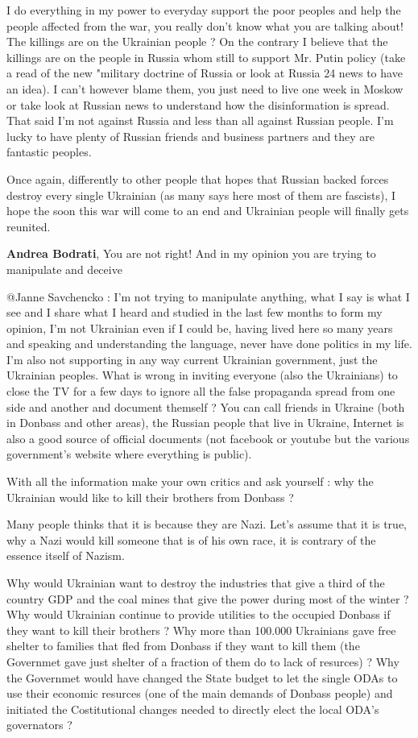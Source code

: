 \begin{itemize}
\begin{itemize}
I do everything in my power to everyday support the poor peoples and help the
people affected from the war, you really don't know what you are talking about!
The killings are on the Ukrainian people ? On the contrary I believe that the
killings are on the people in Russia whom still to support Mr. Putin policy
(take a read of the new "military doctrine of Russia or look at Russia 24 news
to have an idea). I can't however blame them, you just need to live one week in
Moskow or take look at Russian news to understand how the disinformation is
spread. That said I'm not against Russia and less than all against Russian
people. I'm lucky to have plenty of Russian friends and business partners and
they are fantastic peoples.

Once again, differently to other people that hopes that Russian backed forces
destroy every single Ukrainian (as many says here most of them are fascists), I
hope the soon this war will come to an end and Ukrainian people will finally
gets reunited.

\textbf{Andrea Bodrati},
You are not right! And in my opinion you are trying to manipulate and deceive



@Janne Savchencko : I'm not trying to manipulate anything, what I say is what I
see and I share what I heard and studied in the last few months to form my
opinion, I'm not Ukrainian even if I could be, having lived here so many years
and speaking and understanding the language, never have done politics in my
life. I'm also not supporting in any way current Ukrainian government, just the
Ukrainian peoples. What is wrong in inviting everyone (also the Ukrainians) to
close the TV for a few days to ignore all the false propaganda spread from one
side and another and document themself ? You can call friends in Ukraine (both
in Donbass and other areas), the Russian people that live in Ukraine, Internet
is also a good source of official documents (not facebook or youtube but the
various government's website where everything is public). 

With all the information make your own critics and ask yourself : why the
Ukrainian would like to kill their brothers from Donbass ? 

Many people thinks that it is because they are Nazi. Let's assume that it is
true, why a Nazi would kill someone that is of his own race, it is contrary of
the essence itself of Nazism. 

Why would Ukrainian want to destroy the industries that give a third of the
country GDP and the coal mines that give the power during most of the winter ?
Why would Ukrainian continue to provide utilities to the occupied Donbass if
they want to kill their brothers ? Why more than 100.000 Ukrainians gave free
shelter to families that fled from Donbass if they want to kill them (the
Governmet gave just shelter of a fraction of them do to lack of resurces) ? Why
the Governmet would have changed the State budget to let the single ODAs to use
their economic resurces (one of the main demands of Donbass people) and
initiated the Costitutional changes needed to directly elect the local ODA's
governators ? 


\end{itemize}
\end{itemize}
